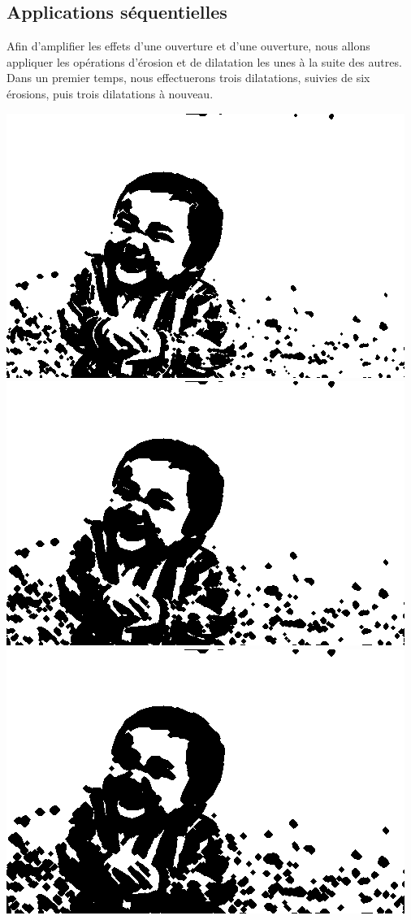 \documentclass[a4paper,11pt]{article}
\begin{document}
\subsection{Applications séquentielles}
Afin d'amplifier les effets d'une ouverture et d'une ouverture, nous allons appliquer les opérations d'érosion et de dilatation les unes à la suite des autres.\\
Dans un premier temps, nous effectuerons trois dilatations, suivies de six érosions, puis trois dilatations à nouveau.
\begin{center}
\includegraphics[scale=0.22]{babyd1.png}
\includegraphics[scale=0.22]{babyd2.png}
\includegraphics[scale=0.22]{babyd3.png}\\

\end{center}
\end{document}
